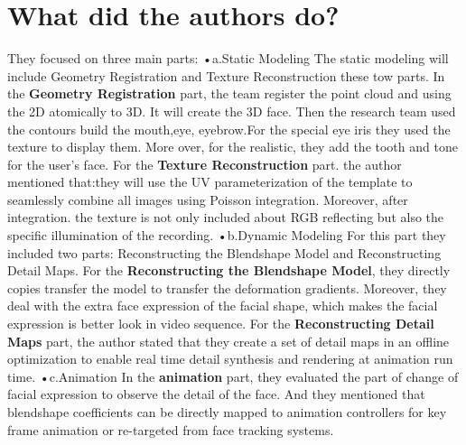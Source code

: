 \documentclass[12pt,a4paper,titlepage]{article}
\begin{document}
\section{What did the authors do?}{
They focused on three main parts:\newline
•a.Static Modeling\newline
 The static modeling will include Geometry Registration and Texture Reconstruction these tow parts.\newline
In the \textbf{Geometry Registration }part, the team register the point cloud and using the 2D atomically to 3D. It will create the 3D face. Then the research team used the contours build the mouth,eye, eyebrow.For the special eye iris they used the texture to display them. More over, for the realistic, they add the tooth and tone for the user's face.\newline
 For the \textbf{Texture Reconstruction} part. the author mentioned that:they will use the UV parameterization of the template to seamlessly combine all images using Poisson integration. Moreover, after integration. the texture is not only included about RGB reflecting but also the specific illumination of the recording. \newline
•b.Dynamic Modeling\newline
For this part they included two parts: Reconstructing the Blendshape Model and Reconstructing Detail Maps.\newline
For the \textbf{Reconstructing the Blendshape Model}, they directly copies transfer the model to transfer the deformation gradients. Moreover, they deal with the extra face expression of the facial shape, which makes the facial expression is better look in video sequence.\newline
For the \textbf{Reconstructing Detail Maps} part, the author stated that they create a set of detail maps in an offline optimization to enable real time detail synthesis and rendering at animation run time.\newline
•c.Animation\newline
In the\textbf{ animation} part, they evaluated the part of change of facial expression to observe the detail of the face. And they mentioned that  blendshape coefficients can be directly mapped to animation controllers for key frame animation or re-targeted from face tracking systems.
}
\label{sec:q3sec}
\end{document}
